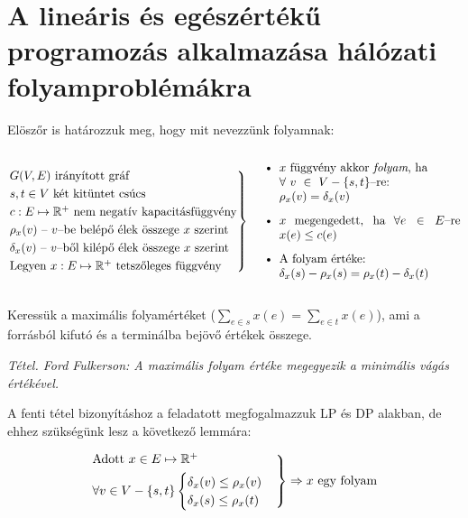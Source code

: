 \section{A lineáris és egészértékű programozás alkalmazása hálózati folyamproblémákra}

Elöszőr is határozzuk meg, hogy mit nevezzünk folyamnak: 

\[	
\begin{rcases}
G(V,E) \mbox{ irányított gráf} \\
s,t \in V \mbox{ két kitüntet csúcs} \\
c : E \mapsto \mathbb{R}^+ \mbox{ nem negatív kapacitásfüggvény}\\
\rho_x(v) \mbox{ -- } v\mbox{--be belépő élek összege } x \mbox{ szerint} \\
\delta_x(v) \mbox{ -- } v\mbox{--ből kilépő élek összege } x \mbox{ szerint}\\
\mbox{Legyen }x : E \mapsto \mathbb{R}^+ \mbox{ tetszőleges függvény}
\end{rcases} \parbox[c]{6.2cm}{
\begin{itemize}
  \item $x$ függvény akkor \emph{folyam}, ha \\ $\forall~v~\in~V - \{s,t\}$--re: \\ $\rho_x(v)=\delta_x(v)$
  \item $x$ megengedett, ha $\forall e \in E$--re $x(e) \leq c(e)$
  \item A folyam értéke: \\ $\delta_x(s)-\rho_x(s)=\rho_x(t)-\delta_x(t)$
\end{itemize}
}
\]

Keressük a maximális folyamértéket ($\sum_{e \in s}x(e)=\sum_{e \in t}x(e)$),
ami a forrásból kifutó és a terminálba bejövő értékek összege.

\vspace{0.4cm}
\emph{Tétel. Ford Fulkerson: A maximális folyam értéke megegyezik a minimális vágás értékével.}
\vspace{0.4cm}

A fenti tétel bizonyításhoz a feladatott megfogalmazzuk LP és DP alakban, de
ehhez szükségünk lesz a következő lemmára:

\[
\begin{rcases}
\mbox{Adott } x \in E \mapsto \mathbb{R}^+\\
\forall v \in V - \{s,t\} \begin{cases}
\delta_x(v) \leq \rho_x(v) \\
\delta_x(s) \leq \rho_x(t)
\end{cases} 
\end{rcases}
\Rightarrow  x \mbox{ egy folyam}
\]

